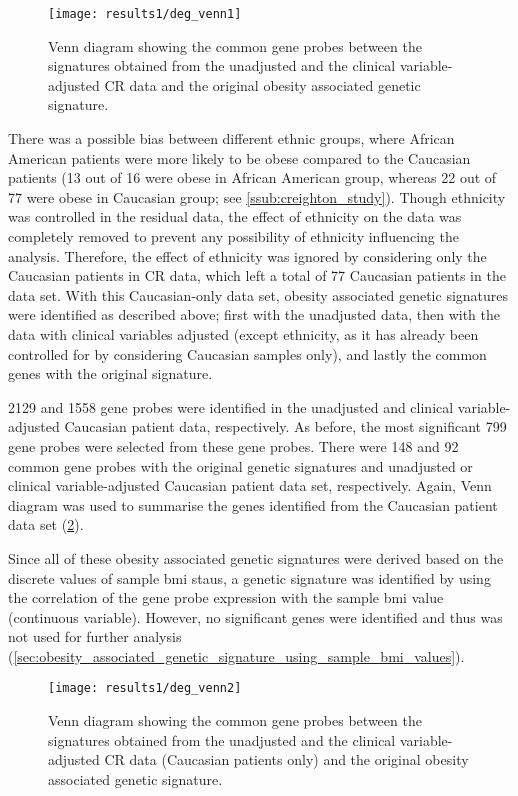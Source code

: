 \begin{figure}[htpb]
	\centering
	\texttt{[image: results1/deg\_venn1]}
	\caption[Venn diagram of the \glspl{deg} identified from the CR data (all patients included)]{Venn diagram showing the common gene probes between the signatures obtained from the unadjusted and the clinical variable-adjusted CR data and the original obesity associated genetic signature. }
	\label{fig:venn1}
\end{figure}

\noindent
There was a possible bias between different ethnic groups, where African American patients were more likely to be obese compared to the Caucasian patients (13 out of 16 were obese in African American group, whereas 22 out of 77 were obese in Caucasian group; see \cref{ssub:creighton_study}).
Though ethnicity was controlled in the residual data, the effect of ethnicity on the data was completely removed to prevent any possibility of ethnicity influencing the analysis.
Therefore, the effect of ethnicity was ignored by considering only the Caucasian patients in CR data, which left a total of 77 Caucasian patients in the data set.
With this Caucasian-only data set, obesity associated genetic signatures were identified as described above; first with the unadjusted data, then with the data with clinical variables adjusted (except ethnicity, as it has already been controlled for by considering Caucasian samples only), and lastly the common genes with the original signature.

2129 and 1558 gene probes were identified in the unadjusted and clinical variable-adjusted Caucasian patient data, respectively.
As before, the most significant 799 gene probes were selected from these gene probes.
There were 148 and 92 common gene probes with the original genetic signatures and unadjusted or clinical variable-adjusted Caucasian patient data set, respectively.
Again, Venn diagram was used to summarise the genes identified from the Caucasian patient data set (\cref{fig:venn2}).

Since all of these obesity associated genetic signatures were derived based on the discrete values of sample \gls{bmi} staus, a genetic signature was identified by using the correlation of the gene probe expression with the sample \gls{bmi} value (continuous variable).
However, no significant genes were identified and thus was not used for further analysis (\cref{sec:obesity_associated_genetic_signature_using_sample_bmi_values}).

\begin{figure}[htpb]
	\centering
	\texttt{[image: results1/deg\_venn2]}
	\caption[Venn diagram of the \glspl{deg} identified from the CR data (Caucasian patients only)]{Venn diagram showing the common gene probes between the signatures obtained from the unadjusted and the clinical variable-adjusted CR data (Caucasian patients only) and the original obesity associated genetic signature.}
	\label{fig:venn2}
\end{figure}

